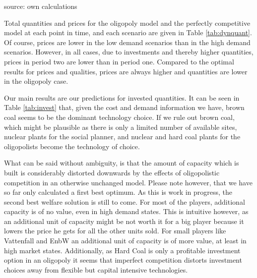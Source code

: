 \begin{table}
\label{tab:dynquant}
\begin{center}
source: own calculations
\end{center}
\end{table}

Total quantities and prices for the oligopoly model and the perfectly competitive model at each point in time, and each scenario are given in Table \ref{tab:dynquant}. Of course, prices are lower in the low demand scenarios than in the high demand scenarios. However, in all cases, due to investments and thereby higher quantities, prices in period two are lower than in period one.
Compared to the optimal results for prices and qualities, prices are always higher and quantities are lower in the oligopoly case.

Our main results are our predictions for invested quantities. It can be seen in Table \ref{tab:invest} that, given the cost and demand information we have, brown coal seems to be the dominant technology choice. If we rule out brown coal, which might be plausible as there is only a limited number of available sites, nuclear plants for the social planner, and nuclear and hard coal plants for the oligopolists become the technology of choice.

What can be said without ambiguity, is that the amount of capacity which is built is considerably distorted downwards by the effects of oligopolistic competition in an otherwise unchanged model. Please note however, that we have so far only calculated a first best optimum. As this is work in progress, the second best welfare solution is still to come. For most of the players, additional capacity is of no value, even in high demand states. This is intuitive however, as an additional unit of capacity might be not worth it for a big player because it lowers the price he gets for all the other units sold. For small players like Vattenfall and EnbW an additional unit of capacity is of more value, at least in high market states. Additionally, as Hard Coal is only a profitable investment option in an oligopoly it seems that imperfect competition distorts investment choices away from flexible but capital intensive technologies.

